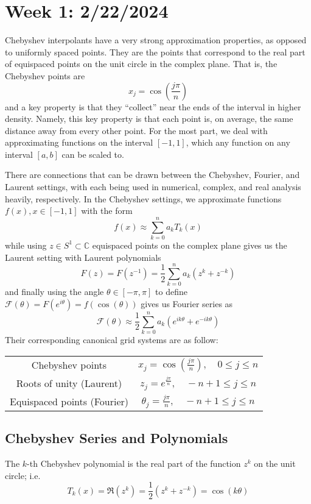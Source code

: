 \section{Week 1: 2/22/2024}
Chebyshev interpolants have a very strong approximation properties, as opposed to uniformly spaced points. They are the points that correspond to the real part of equispaced points on the unit circle in the complex plane. That is, the Chebyshev points are 
\[ x_j = \cos\left(\frac{j\pi}{n}\right) \]
and a key property is that they ``collect'' near the ends of the interval in higher density. Namely, this key property is that each point is, on average, the same distance away from every other point.
For the most part, we deal with approximating functions on the interval $[-1, 1]$, which any function on any interval $[a, b]$ can be scaled to. 

There are connections that can be drawn between the Chebyshev, Fourier, and Laurent settings, with each being used in numerical, complex, and real analysis heavily, respectively. In the Chebyshev settings, we approximate functions $f(x), x \in [-1, 1]$ with the form
\[ f(x) \approx \sum_{k=0}^n a_kT_k(x) \]
while using $z \in S^1 \subset \mathbb{C}$ equispaced points on the complex plane gives us the Laurent setting with Laurent polynomials
\[ F(z) = F(z^{-1}) = \frac{1}{2}\sum_{k=0}^n a_k (z^k + z^{-k}) \]
and finally using the angle $\theta \in [-\pi, \pi]$ to define $\mathcal{F}(\theta) = F(e^{i\theta}) = f(\cos(\theta))$ gives us Fourier series as
\[ \mathcal{F}(\theta) \approx \frac{1}{2}\sum_{k=0}^n a_k(e^{ik\theta} + e ^{-ik\theta}) \]
Their corresponding canonical grid systems are as follow:
\begin{center}
    \begin{tabular}{cc}
        Chebyshev points & $x_j = \cos\left(\frac{j\pi}{n}\right), \quad 0 \leq j \leq n$ \\
        Roots of unity (Laurent) & $z_j = e^{\frac{j\pi}{n}}, \quad -n+1\leq j \leq n$ \\
        Equispaced points (Fourier) & $\theta_j = \frac{j\pi}{n}, \quad -n+1 \leq j \leq n$
    \end{tabular}
\end{center}

\subsection{Chebyshev Series and Polynomials}
\begin{dfn}
    The $k$-th Chebyshev polynomial is the real part of the function $z^k$ on the unit circle; i.e.
    \[ T_k(x) = \Re (z^k) = \frac{1}{2}(z^k + z^{-k}) = \cos(k\theta) \]
\end{dfn}

